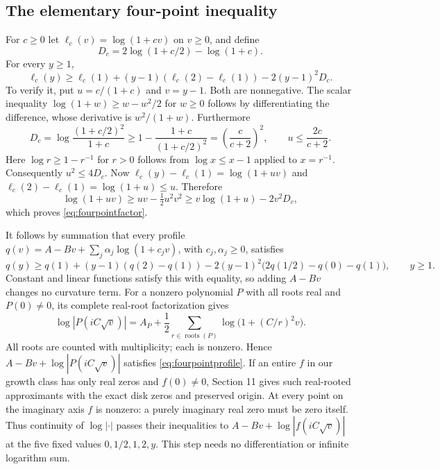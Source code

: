 \documentclass[11pt]{article}
\theoremstyle{remark}\newtheorem{remark}[theorem]{Remark}
\begin{document}
\subsection*{The elementary four-point inequality}
For $c\geq0$ let $\ell_c(v)=\log(1+cv)$ on $v\geq0$, and define
\[
 D_c=2\log(1+c/2)-\log(1+c).
\]
For every $y\geq1$,
\begin{equation}\label{eq:fourpointfactor}
 \ell_c(y)\geq \ell_c(1)+(y-1)(\ell_c(2)-\ell_c(1))
                         -2(y-1)^2D_c.
\end{equation}
To verify it, put $u=c/(1+c)$ and $v=y-1$. Both are nonnegative.
The scalar inequality $\log(1+w)\geq w-w^2/2$ for $w\geq0$ follows
by differentiating the difference, whose derivative is $w^2/(1+w)$.
Furthermore
\[
 D_c=\log\frac{(1+c/2)^2}{1+c}
 \geq1-\frac{1+c}{(1+c/2)^2}
 =\left(\frac c{c+2}\right)^2,
 \qquad u\leq\frac{2c}{c+2}.
\]
Here $\log r\geq1-r^{-1}$ for $r>0$ follows from
$\log x\leq x-1$ applied to $x=r^{-1}$. Consequently $u^2\leq4D_c$.
Now $\ell_c(y)-\ell_c(1)=\log(1+uv)$ and
$\ell_c(2)-\ell_c(1)=\log(1+u)\leq u$. Therefore
\[
 \log(1+uv)\geq uv-\tfrac12u^2v^2
                 \geq v\log(1+u)-2v^2D_c,
\]
which proves \eqref{eq:fourpointfactor}.

It follows by summation that every profile
$q(v)=A-Bv+\sum_j\alpha_j\log(1+c_jv)$, with $c_j,\alpha_j\geq0$,
satisfies
\begin{equation}\label{eq:fourpointprofile}
 q(y)\geq q(1)+(y-1)(q(2)-q(1))
       -2(y-1)^2\bigl(2q(1/2)-q(0)-q(1)\bigr),\qquad y\geq1.
\end{equation}
Constant and linear functions satisfy this with equality, so adding
$A-Bv$ changes no curvature term. For a nonzero polynomial $P$ with
all roots real and $P(0)\ne0$, its complete real-root factorization gives
\[
 \log|P(iC\sqrt v)|
 =A_P+\frac12\sum_{r\in\operatorname{roots}(P)}
                    \log\bigl(1+(C/r)^2v\bigr).
\]
All roots are counted with multiplicity; each is nonzero. Hence
$A-Bv+\log|P(iC\sqrt v)|$ satisfies \eqref{eq:fourpointprofile}.
If an entire $f$ in our growth class has only real zeros and $f(0)\ne0$,
Section 11 gives such real-rooted approximants with the exact disk
zeros and preserved origin. At every point on the imaginary axis
$f$ is nonzero: a purely imaginary real zero must be zero itself.
Thus continuity of $\log|\cdot|$ passes their inequalities to
$A-Bv+\log|f(iC\sqrt v)|$ at the five fixed values
$0,1/2,1,2,y$. This step needs no differentiation or infinite logarithm sum.
\end{document}
